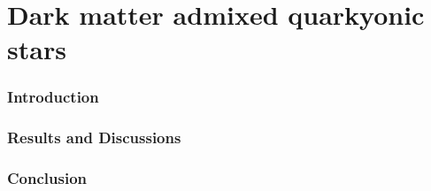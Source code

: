 \chapter{Dark matter admixed quarkyonic stars }
\label{C3} 
\subsection{Introduction}
\subsection{Results and Discussions}
\subsection{Conclusion}











 
 

























































